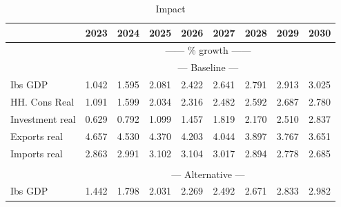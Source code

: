 \documentclass{article}
\begin{document}
\begin{table}
\caption{Impact}
\begin{tabular}{lllllllll}
\toprule
 & 2023 & 2024 & 2025 & 2026 & 2027 & 2028 & 2029 & 2030 \\
\midrule
&\multicolumn{8}{c}{------ \% growth ------}                                                                                                                                                                 \\
&\multicolumn{8}{c}{--- Baseline ---}                                                                                                                                                                 \\
Ibs GDP &                1.042 &                1.595 &                2.081 &                2.422 &                2.641 &                2.791 &                2.913 &                3.025 \\
HH. Cons Real &                1.091 &                1.599 &                2.034 &                2.316 &                2.482 &                2.592 &                2.687 &                2.780 \\
Investment real &                0.629 &                0.792 &                1.099 &                1.457 &                1.819 &                2.170 &                2.510 &                2.837 \\
Exports real &                4.657 &                4.530 &                4.370 &                4.203 &                4.044 &                3.897 &                3.767 &                3.651 \\
Imports real &                2.863 &                2.991 &                3.102 &                3.104 &                3.017 &                2.894 &                2.778 &                2.685 \\
&\multicolumn{8}{c}{     }                                                                                                                                                                 \\
&\multicolumn{8}{c}{--- Alternative ---}                                                                                                                                                                 \\
Ibs GDP &                1.442 &                1.798 &                2.031 &                2.269 &                2.492 &                2.671 &                2.833 &                2.982 \\

\end{tabular}
\end{table}
\end{document}
